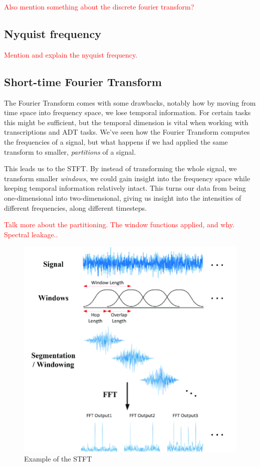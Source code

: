 \textcolor{red}{Also mention something about the discrete fourier transform?}

\subsection{Nyquist frequency}

\textcolor{red}{Mention and explain the nyquist frequency.}

\subsection{Short-time Fourier Transform}

The Fourier Transform comes with some drawbacks, notably how by moving from time space into frequency space, we lose temporal information. For certain tasks this might be sufficient, but the temporal dimension is vital when working with transcriptions and \gls{ADT} tasks. We've seen how the Fourier Transform computes the frequencies of a signal, but what happens if we had applied the same transform to smaller, \textit{partitions} of a signal.

This leads us to the \gls{STFT}. By instead of transforming the whole signal, we transform smaller \textit{windows}, we could gain insight into the frequency space while keeping temporal information relatively intact. This turns our data from being one-dimensional into two-dimensional, giving us insight into the intensities of different frequencies, along different timesteps.

\textcolor{red}{Talk more about the partitioning. The window functions applied, and why. Spectral leakage..}

\begin{figure}[H]
    \centering
    \includegraphics[scale=0.35]{figures/stft}
    \caption{Example of the \gls{STFT}}
    \label{STFTFigure}
\end{figure}

